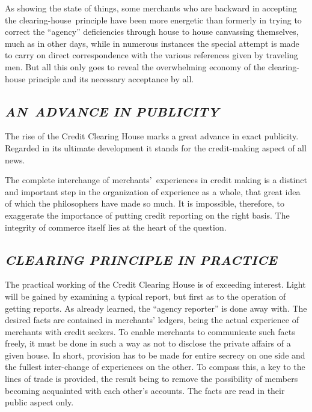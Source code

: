 \documentclass[twoside,symmetric,nobib,justified]{tufte-book}
\begin{document}
As showing the state of things, some merchants who are backward in
accepting the clearing-house~principle have been more energetic than
formerly in trying to correct the ``agency'' deficiencies through house
to house canvassing themselves, much as in other days, while in numerous
instances the special attempt is made to carry on direct correspondence
with the various references given by traveling men. But all this only
goes to reveal the overwhelming economy of the clearing-house principle
and its necessary acceptance by all.~

\hypertarget{an-advance-in-publicity}{%
\subsection{\texorpdfstring{\emph{AN~ADVANCE IN
PUBLICITY}}{AN~ADVANCE IN PUBLICITY}}\label{an-advance-in-publicity}}

The rise of the Credit Clearing House marks a great advance in exact
publicity. Regarded in its ultimate development it stands for the
credit-making aspect of all news.~

The complete interchange of merchants'~experiences in credit making is a
distinct and important step in the organization of experience as a
whole, that great idea of which the philosophers have made so much. It
is impossible, therefore, to exaggerate the importance of putting credit
reporting on the right basis. The integrity of commerce itself lies at
the heart of the question.



\hypertarget{clearing-principle-in-practice}{%
\subsection{\texorpdfstring{\emph{CLEARING PRINCIPLE IN
PRACTICE}~}{CLEARING PRINCIPLE IN PRACTICE~}}\label{clearing-principle-in-practice}}

The practical working of the Credit Clearing House is of exceeding
interest. Light will be gained by examining a typical report, but first
as to the operation of getting reports. As already learned, the ``agency
reporter'' is done away with. The desired facts are contained in
merchants' ledgers, being the actual experience of merchants with credit
seekers. To enable merchants to communicate such facts freely, it must
be done in such a way as not to disclose the private affairs of a given
house. In short, provision has to be made for entire secrecy on one side
and the fullest inter-change of experiences on the other. To compass
this, a key to the lines of trade is provided, the result being to
remove the possibility of members becoming acquainted with each other's
accounts. The facts are read in their public aspect only.~
\end{document}
